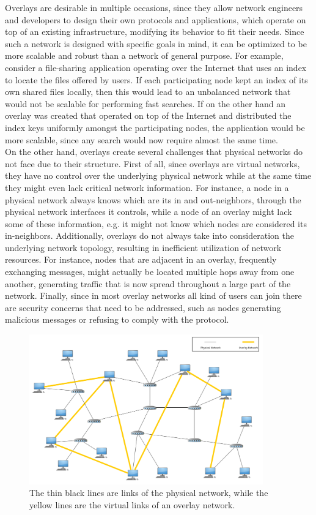 \documentclass[a4paper,11pt,twoside]{report}
\begin{document}
Overlays are desirable in multiple occasions, since they allow network engineers and developers to design their own protocols and applications, which operate on top of an existing infrastructure, modifying its behavior to fit their needs. Since such a network is designed with specific goals in mind, it can be optimized to be more scalable and robust than a network of general purpose. For example, consider a file-sharing application operating over the Internet that uses an index to locate the files offered by users. If each participating node kept an index of its own shared files locally, then this would lead to an unbalanced network that would not be scalable for performing fast searches. If on the other hand an overlay was created that operated on top of the Internet and distributed the index keys uniformly amongst the participating nodes, the application would be more scalable, since any search would now require almost the same time.\\

On the other hand, overlays create several challenges that physical networks do not face due to their structure. First of all, since overlays are virtual networks, they have no control over the underlying physical network while at the same time they might even lack critical network information. For instance, a node in a physical network always knows which are its in and out-neighbors, through the physical network interfaces it controls, while a node of an overlay might lack some of these information, e.g. it might not know which nodes are considered its in-neighbors. Additionally, overlays do not always take into consideration the underlying network topology, resulting in inefficient utilization of network resources. For instance, nodes that are adjacent in an overlay, frequently exchanging messages, might actually be located multiple hops away from one another, generating traffic that is now spread throughout a large part of the network. Finally, since in most overlay networks all kind of users can join there are security concerns that need to be addressed, such as nodes generating malicious messages or refusing to comply with the protocol.


\begin{figure}[h]
\centering
\includegraphics[width=0.9\textwidth]{../figures/network_overlay.png}
\caption{The thin black lines are links of the physical network, while the yellow lines are the virtual links of an overlay network.}
\label{fig:overlay_network}
\end{figure}
\end{document}
